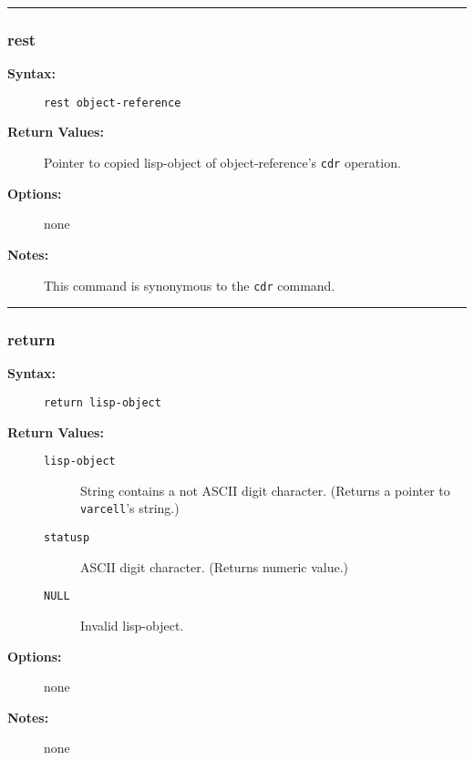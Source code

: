 \hrule
\subsubsection{rest}

\begin{description}
\item[{\bf Syntax:}] \mbox{}

{\tt rest object-reference}

\item[{\bf Return Values:}] \mbox{}

Pointer to copied lisp-object of 
object-reference's {\tt cdr} operation.

\item[{\bf Options:}] \mbox{}

none  

\item[{\bf Notes:}] \mbox{}

This command is synonymous to the {\tt cdr}
command.

\end{description}


\hrule
\subsubsection{return}

\begin{description}
\item[{\bf Syntax:}] \mbox{}

{\tt return lisp-object}

\item[{\bf Return Values:}] \mbox{}

\begin{description}
\item[{\tt lisp-object}] \mbox{}

String contains a not ASCII digit character.    
(Returns a pointer to {\tt varcell}'s string.)

\item[{\tt statusp}] \mbox{}

ASCII digit character. (Returns numeric value.)

\item[{\tt NULL}] \mbox{}

Invalid lisp-object.

\end{description}


\item[{\bf Options:}] \mbox{}

none  

\item[{\bf Notes:}] \mbox{}

none  

\end{description}


